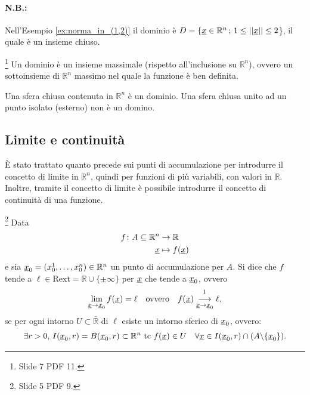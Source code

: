 \paragraph{N.B.:} Nell'Esempio \ref{ex:norma_in_(1,2)} il dominio è $D=\{\uline x\in\mathbb R^n\,;\, 1\leq||\uline x||\leq 2$\}, il quale è un insieme chiuso.

\begin{remark}\footnote{Slide 7 PDF 11.}
    Un dominio è un insieme massimale (rispetto all'inclusione su $\mathbb R^n$), ovvero un sottoinsieme di $\mathbb R^n$ massimo nel quale la funzione è ben definita.
\end{remark}

\begin{example}
    Una sfera chiusa contenuta in $\mathbb R^n$ è un dominio. Una sfera chiusa unito ad un punto isolato (esterno) non è un domino.
\end{example}

\subsection{Limite e continuità}
È stato trattato quanto precede sui punti di accumulazione per introdurre il concetto di limite in $\mathbb R^n$, quindi per funzioni di più variabili, con valori in $\mathbb R$. Inoltre, tramite il concetto di limite è possibile introdurre il concetto di continuità di una funzione.

\begin{definition}\label{def:limite_funzione_piu_variabili}\footnote{Slide 5 PDF 9.}
    Data
    \begin{equation*}
        \begin{aligned}
            f\colon A\subseteq\mathbb R^n & \rightarrow \mathbb R\\
            \uline x &\mapsto f(\uline x)
        \end{aligned}
    \end{equation*}
    e sia $\uline x_0=(x_0^1,\hdots,x_0^n)\in\mathbb R^n$ un punto di accumulazione per $A$. Si dice che $f$ tende a $\ell\in$\gls{Rext}$=\mathbb R\cup\{\pm\infty\}$ per $\uline x$ che tende a $\uline x_0$, ovvero
    \begin{equation}\label{eq:limite_funzione_piu_variabili}
        \lim\limits_{\uline x\rightarrow\uline x_0}f(\uline x)=\ell \quad\text{ovvero}\quad f(\uline x)\overset{\footnotemark}{\underset{\uline x\rightarrow\uline x_0}{\longrightarrow}}\ell,
    \end{equation}
    \footnotemark se per ogni intorno $U\subset\overline{\mathbb R}$ di $\ell$ esiste un intorno sferico di $\uline x_0$, ovvero:
    \begin{equation*}
        \exists r>0,\, I(\uline x_0, r)=B(\uline x_0,r)\subset\mathbb R^n \text{ tc } f(\uline x)\in U\quad \forall\uline x\in I(\uline x_0,r)\cap(A\backslash\{\uline x_0\}).
    \end{equation*}
\end{definition}

